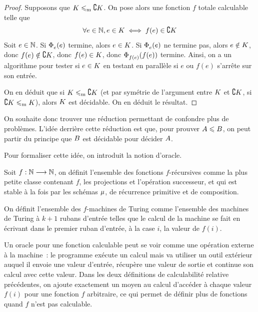 \begin{proof}
  Supposons que $K \leqslant_{\mathrm{m}} \complement K$. On pose alors une fonction
  $f$ totale calculable telle que
  \[\forall e \in \mathbb N, e \in K \iff f(e) \in \complement K\]
  Soit $e \in \mathbb N$. Si $\operatorname{\Phi}_{e}^{}(e)$ termine, alors $e \in K$. Si
  $\operatorname{\Phi}_{e}^{}(e)$ ne termine pas, alors $e \notin K$, donc
  $f(e) \notin \complement K$, donc $f(e) \in K$, donc
  $\operatorname{\Phi}_{f(e)}^{}(f(e))$ termine. Ainsi, on a un algorithme pour tester si
  $e \in K$ en testant en parallèle si $e$ ou $f(e)$ s'arrête sur son entrée.

  On en déduit que si $K \leqslant_{\mathrm{m}} \complement K$ (et par symétrie de
  l'argument entre $K$ et $\complement K$, si
  $\complement K \leqslant_{\mathrm{m}} K$), alors $K$ est décidable. On en déduit le
  résultat.
\end{proof}

On souhaite donc trouver une réduction permettant de confondre plus de
problèmes.
L'idée derrière cette réduction est que, pour prouver $A \leqslant B$, on
peut partir du principe que $B$ est décidable pour décider $A$.

Pour formaliser cette idée, on introduit la notion d'oracle.

\begin{definition}
  Soit $f : \displaystyle \mathbb N \longrightarrow \mathbb N$, on définit l'ensemble des fonctions
  $f$-récursives comme la plus petite classe contenant $f$, les projections et
  l'opération successeur, et qui est stable à la fois par les schémas $\mathbin{\mu}$,
  de récurrence primitive et de composition.

  On définit l'ensemble des $f$-machines de Turing comme l'ensemble des
  machines de Turing à $k+1$ rubans d'entrée telles que le calcul de la machine
  se fait en écrivant dans le premier ruban d'entrée, à la case $i$, la valeur
  de $f(i)$.
\end{definition}

Un oracle pour une fonction calculable peut se voir comme une opération
externe à la machine~: le programme exécute un calcul mais va utiliser un
outil extérieur auquel il envoie une valeur d'entrée, récupère une valeur de
sortie et continue son calcul avec cette valeur. Dans les deux
définitions de calculabilité relative précédentes, on ajoute exactement un
moyen au calcul d'accéder à chaque valeur $f(i)$ pour une fonction $f$
arbitraire, ce qui permet de définir plus de fonctions quand $f$ n'est pas
calculable.

